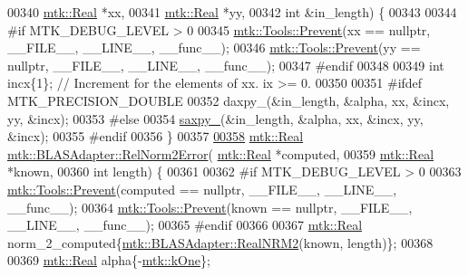 \begin{DoxyCode}
00340                                      \hyperlink{group__c01-roots_gac080bbbf5cbb5502c9f00405f894857d}{mtk::Real} *xx,
00341                                      \hyperlink{group__c01-roots_gac080bbbf5cbb5502c9f00405f894857d}{mtk::Real} *yy,
00342                                      \textcolor{keywordtype}{int} &in\_length) \{
00343 
00344 \textcolor{preprocessor}{  #if MTK\_DEBUG\_LEVEL > 0}
00345   \hyperlink{classmtk_1_1Tools_afe5bb096309258e2e72503fd7b41c7e0}{mtk::Tools::Prevent}(xx == \textcolor{keyword}{nullptr}, \_\_FILE\_\_, \_\_LINE\_\_, \_\_func\_\_);
00346   \hyperlink{classmtk_1_1Tools_afe5bb096309258e2e72503fd7b41c7e0}{mtk::Tools::Prevent}(yy == \textcolor{keyword}{nullptr}, \_\_FILE\_\_, \_\_LINE\_\_, \_\_func\_\_);
00347 \textcolor{preprocessor}{  #endif}
00348 
00349   \textcolor{keywordtype}{int} incx\{1\};  \textcolor{comment}{// Increment for the elements of xx. ix >= 0.}
00350 
00351 \textcolor{preprocessor}{  #ifdef MTK\_PRECISION\_DOUBLE}
00352   daxpy\_(&in\_length, &alpha, xx, &incx, yy, &incx);
00353 \textcolor{preprocessor}{  #else}
00354   \hyperlink{namespacemtk_a81a2d7d1ea9eff65ae13646c93dad5e9}{saxpy\_}(&in\_length, &alpha, xx, &incx, yy, &incx);
00355 \textcolor{preprocessor}{  #endif}
00356 \}
00357 
\hypertarget{mtk__blas__adapter_8cc_source_l00358}{}\hyperlink{classmtk_1_1BLASAdapter_af2ac5691f45e67d6e26186b071119ec4}{00358} \hyperlink{group__c01-roots_gac080bbbf5cbb5502c9f00405f894857d}{mtk::Real} \hyperlink{classmtk_1_1BLASAdapter_af2ac5691f45e67d6e26186b071119ec4}{mtk::BLASAdapter::RelNorm2Error}(
      \hyperlink{group__c01-roots_gac080bbbf5cbb5502c9f00405f894857d}{mtk::Real} *computed,
00359                                           \hyperlink{group__c01-roots_gac080bbbf5cbb5502c9f00405f894857d}{mtk::Real} *known,
00360                                           \textcolor{keywordtype}{int} length) \{
00361 
00362 \textcolor{preprocessor}{  #if MTK\_DEBUG\_LEVEL > 0}
00363   \hyperlink{classmtk_1_1Tools_afe5bb096309258e2e72503fd7b41c7e0}{mtk::Tools::Prevent}(computed == \textcolor{keyword}{nullptr}, \_\_FILE\_\_, \_\_LINE\_\_, \_\_func\_\_);
00364   \hyperlink{classmtk_1_1Tools_afe5bb096309258e2e72503fd7b41c7e0}{mtk::Tools::Prevent}(known == \textcolor{keyword}{nullptr}, \_\_FILE\_\_, \_\_LINE\_\_, \_\_func\_\_);
00365 \textcolor{preprocessor}{  #endif}
00366 
00367   \hyperlink{group__c01-roots_gac080bbbf5cbb5502c9f00405f894857d}{mtk::Real} norm\_2\_computed\{\hyperlink{classmtk_1_1BLASAdapter_ab92440888b730863244c5d9479c11aca}{mtk::BLASAdapter::RealNRM2}(known, length)\};
00368 
00369   \hyperlink{group__c01-roots_gac080bbbf5cbb5502c9f00405f894857d}{mtk::Real} alpha\{-\hyperlink{group__c01-roots_ga26407c24d43b6b95480943340d285c71}{mtk::kOne}\};

\end{DoxyCode}
